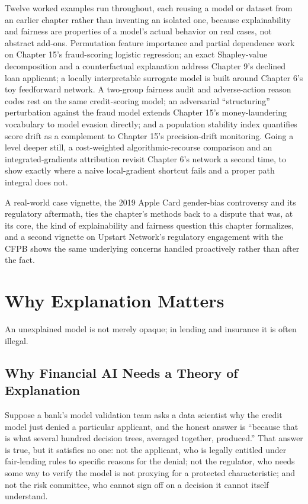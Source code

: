 \documentclass[../ai_in_finance]{subfiles}
\begin{document}
Twelve worked examples run throughout, each reusing a model or dataset from an earlier chapter rather than inventing an isolated one, because explainability and fairness are properties of a model's actual behavior on real cases, not abstract add-ons. Permutation feature importance and partial dependence work on Chapter 15's fraud-scoring logistic regression; an exact Shapley-value decomposition and a counterfactual explanation address Chapter 9's declined loan applicant; a locally interpretable surrogate model is built around Chapter 6's toy feedforward network. A two-group fairness audit and adverse-action reason codes rest on the same credit-scoring model; an adversarial ``structuring'' perturbation against the fraud model extends Chapter 15's money-laundering vocabulary to model evasion directly; and a population stability index quantifies score drift as a complement to Chapter 15's precision-drift monitoring. Going a level deeper still, a cost-weighted algorithmic-recourse comparison and an integrated-gradients attribution revisit Chapter 6's network a second time, to show exactly where a naive local-gradient shortcut fails and a proper path integral does not.

A real-world case vignette, the 2019 Apple Card gender-bias controversy and its regulatory aftermath, ties the chapter's methods back to a dispute that was, at its core, the kind of explainability and fairness question this chapter formalizes, and a second vignette on Upstart Network's regulatory engagement with the CFPB shows the same underlying concerns handled proactively rather than after the fact.

\section{Why Explanation Matters}

An unexplained model is not merely opaque; in lending and insurance it is often illegal.

\subsection{Why Financial AI Needs a Theory of Explanation}
\label{sec:xai-why}

Suppose a bank's model validation team asks a data scientist why the credit model just denied a particular applicant, and the honest answer is ``because that is what several hundred decision trees, averaged together, produced.'' That answer is true, but it satisfies no one: not the applicant, who is legally entitled under fair-lending rules to specific reasons for the denial; not the regulator, who needs some way to verify the model is not proxying for a protected characteristic; and not the risk committee, who cannot sign off on a decision it cannot itself understand.
\end{document}
